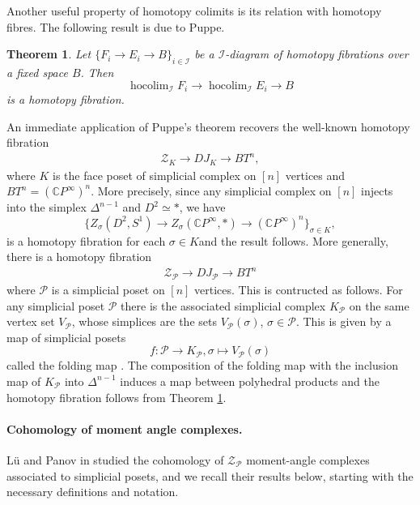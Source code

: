 \documentclass[a4paper,11pt]{article}
\newtheorem{theorem}{Theorem}[section]
\theoremstyle{definition}
\DeclareMathOperator*{\hocolim}{hocolim}
\newcommand{\C}{\mathbb{C}}
\newcommand{\II}{\mathcal{I}}
\newcommand{\PP}{\mathcal{P}}
\newcommand{\ZZ}{\mathcal{Z}}
\begin{document}
Another useful property of homotopy colimits is its relation with homotopy fibres. The following result is due to Puppe.

\begin{theorem}\cite[Appendix~HL]{dror-book}\label{puppe-theo}
Let $\{F_i \to E_i \to B\}_{i \in \II}$ be a $\II$-diagram of homotopy fibrations over a fixed space $B$. Then 
\[\hocolim_\II F_i \to \hocolim_\II E_i \to B\]
is a homotopy fibration. 
\end{theorem}

An immediate application of Puppe's theorem recovers the well-known homotopy fibration \cite[Theorem~4.3.2]{toric-comb-alg-buchstaberpanov}
\begin{align}
\ZZ_K \to DJ_K \to BT^n, \label{classical-homotopy-fibration}
\end{align}
where $K$ is the face poset of simplicial complex on $[n]$ vertices and $BT^n = (\C P^\infty)^n$. More precisely, since any simplicial complex on $[n]$ injects into the simplex $\Delta^{n-1}$ and $D^2 \simeq *$, we have 
\[
\{Z_\sigma(D^2,S^1) \to Z_\sigma(\C P^\infty,*) \to (\C P^\infty)^n\}_{\sigma \in K},
\]
is a homotopy fibration for each $\sigma \in K $and the result follows. More generally, there is a homotopy fibration 
\begin{align}
    \ZZ_\PP \to DJ_\PP \to BT^n \label{folding-homotopy-fibration}
\end{align}
where $\PP$ is a simplicial poset on $[n]$ vertices. This is contructed as follows. For any simplicial poset $\PP$ there is the associated simplicial complex $K_\PP$ on the same vertex set $V_\PP$, whose simplices are the sets $V_\PP(\sigma)$, $\sigma \in \PP$. This is given by a map of simplicial posets 
\[
f: \PP \to K_\PP, \sigma \mapsto V_\PP(\sigma)
\]
called the folding map \cite[Construction~2.8.3]{buchstaber2014toric}. The composition of the folding map with the inclusion map of $K_\PP$ into $\Delta^{n-1}$ induces a map between polyhedral products and the homotopy fibration follows from Theorem \ref{puppe-theo}.


\paragraph{Cohomology of moment angle complexes.} L\"u and Panov in \cite{lue-panov} studied the cohomology of $\ZZ_\PP$ moment-angle complexes associated to simplicial posets, and we recall their results below, starting with the necessary definitions and notation. 
\end{document}
